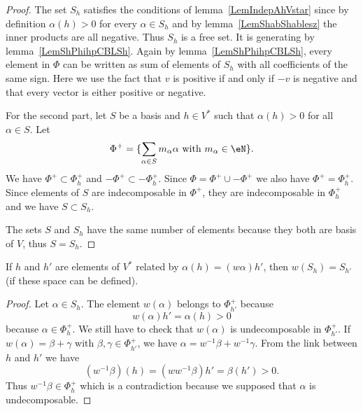 \begin{proof}
    The set \( S_h\) satisfies the conditions of lemma~\ref{LemIndepAhVstar} since by definition \( \alpha(h)>0\) for every \( \alpha\in S_h\) and by lemma~\ref{LemShabShablesz} the inner products are all negative. Thus \( S_h\) is a free set. It is generating by lemma~\ref{LemShPhihpCBLSh}. Again by lemma~\ref{LemShPhihpCBLSh}, every element in \( \Phi\) can be written as sum of elements of \( S_h\) with all coefficients of the same sign. Here we use the fact that \( v\) is positive if and only if \( -v\) is negative and that every vector is either positive or negative.

    For the second part, let \( S\) be a basis and \( h\in V^*\) such that \( \alpha(h)>0\) for all \( \alpha\in S\). Let
    \begin{equation}
        \Phi^+=\{ \sum_{\alpha\in S}m_{\alpha}\alpha \text{ with } m_{\alpha}\in\eN \}.
    \end{equation}
    We have \( \Phi^+\subset\Phi_h^+\) and \( -\Phi^+\subset -\Phi_h^+\). Since \( \Phi=\Phi^+\cup-\Phi^+\) we also have \( \Phi^+=\Phi_h^+\). Since elements of \( S\) are indecomposable in \( \Phi^+\), they are indecomposable in \( \Phi^+_h\) and we have \( S\subset S_h\).

    The sets \( S\) and \( S_h\) have the same number of elements because they both are basis of \( V\), thus \( S=S_h\).
\end{proof}

\begin{lemma}\label{LemwShShpahwahp}
    If \( h\) and \( h'\) are elements of \( V^*\) related by \( \alpha(h)=(w\alpha)h'\), then \( w(S_h)=S_{h'}\) (if these space can be defined).
\end{lemma}

\begin{proof}
    Let \( \alpha\in S_h\). The element \( w(\alpha)\) belongs to \( \Phi_{h'}^+\) because
    \begin{equation}
        w(\alpha)h'=\alpha(h)>0
    \end{equation}
    because \( \alpha\in\Phi_h^+\). We still have to check that \( w(\alpha)\) is undecomposable in \( \Phi_{h'}^+\). If \( w(\alpha)=\beta+\gamma\) with \( \beta,\gamma\in\Phi_{h'}^+\), we have \( \alpha=w^{-1}\beta+w^{-1}\gamma\). From the link between \( h\) and \( h'\) we have
    \begin{equation}
        (w^{-1}\beta)(h)=(ww^{-1}\beta)h'=\beta(h')>0.
    \end{equation}
    Thus \( w^{-1}\beta\in \Phi_h^+\) which is a contradiction because we supposed that \( \alpha\) is undecomposable.
\end{proof}

